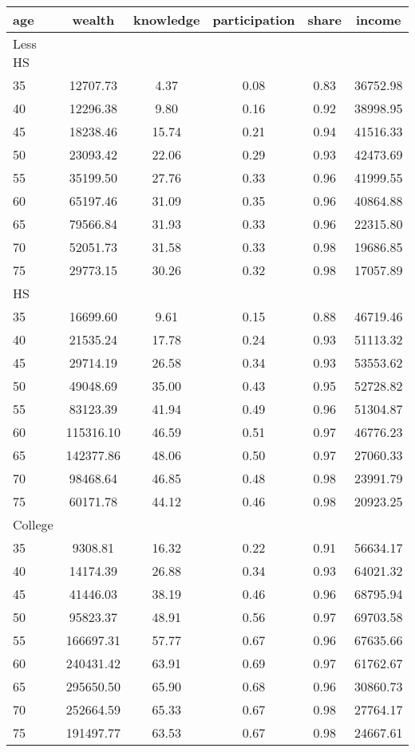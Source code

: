  \begin{tabular}{lccccc}
 \hline \hline
  age & wealth & knowledge & participation & share & income \\
 \hline
 Less HS & & & & & \\
 \hline
35 &  12707.73 &      4.37 &      0.08 &      0.83 &  36752.98 \\ 
40 &  12296.38 &      9.80 &      0.16 &      0.92 &  38998.95 \\ 
45 &  18238.46 &     15.74 &      0.21 &      0.94 &  41516.33 \\ 
50 &  23093.42 &     22.06 &      0.29 &      0.93 &  42473.69 \\ 
55 &  35199.50 &     27.76 &      0.33 &      0.96 &  41999.55 \\ 
60 &  65197.46 &     31.09 &      0.35 &      0.96 &  40864.88 \\ 
65 &  79566.84 &     31.93 &      0.33 &      0.96 &  22315.80 \\ 
70 &  52051.73 &     31.58 &      0.33 &      0.98 &  19686.85 \\ 
75 &  29773.15 &     30.26 &      0.32 &      0.98 &  17057.89 \\ 
 \hline
 HS & & & & & \\
 \hline
35 &  16699.60 &      9.61 &      0.15 &      0.88 &  46719.46 \\ 
40 &  21535.24 &     17.78 &      0.24 &      0.93 &  51113.32 \\ 
45 &  29714.19 &     26.58 &      0.34 &      0.93 &  53553.62 \\ 
50 &  49048.69 &     35.00 &      0.43 &      0.95 &  52728.82 \\ 
55 &  83123.39 &     41.94 &      0.49 &      0.96 &  51304.87 \\ 
60 & 115316.10 &     46.59 &      0.51 &      0.97 &  46776.23 \\ 
65 & 142377.86 &     48.06 &      0.50 &      0.97 &  27060.33 \\ 
70 &  98468.64 &     46.85 &      0.48 &      0.98 &  23991.79 \\ 
75 &  60171.78 &     44.12 &      0.46 &      0.98 &  20923.25 \\ 
 \hline
 College & & & & & \\
 \hline
35 &   9308.81 &     16.32 &      0.22 &      0.91 &  56634.17 \\ 
40 &  14174.39 &     26.88 &      0.34 &      0.93 &  64021.32 \\ 
45 &  41446.03 &     38.19 &      0.46 &      0.96 &  68795.94 \\ 
50 &  95823.37 &     48.91 &      0.56 &      0.97 &  69703.58 \\ 
55 & 166697.31 &     57.77 &      0.67 &      0.96 &  67635.66 \\ 
60 & 240431.42 &     63.91 &      0.69 &      0.97 &  61762.67 \\ 
65 & 295650.50 &     65.90 &      0.68 &      0.96 &  30860.73 \\ 
70 & 252664.59 &     65.33 &      0.67 &      0.98 &  27764.17 \\ 
75 & 191497.77 &     63.53 &      0.67 &      0.98 &  24667.61 \\ 
 \hline \hline
 \end{tabular}
